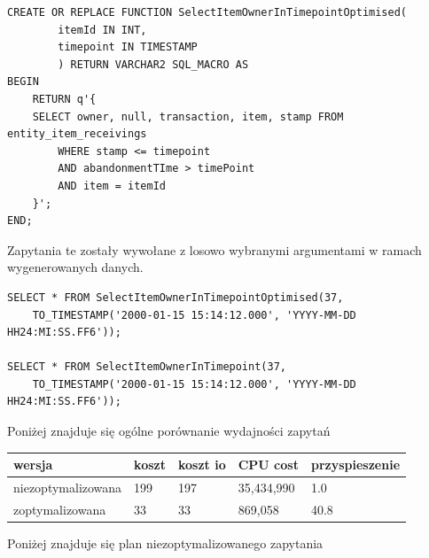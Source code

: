 \documentclass[11pt]{article}
\numberwithin{figure}{subsection}
\begin{document}
		\begin{lstlisting}[caption={Wersja zoptymalizowana},captionpos=b]
CREATE OR REPLACE FUNCTION SelectItemOwnerInTimepointOptimised(
		itemId IN INT,
		timepoint IN TIMESTAMP
		) RETURN VARCHAR2 SQL_MACRO AS
BEGIN
	RETURN q'{
	SELECT owner, null, transaction, item, stamp FROM entity_item_receivings
		WHERE stamp <= timepoint
		AND abandonmentTIme > timePoint
		AND item = itemId
	}';
END;
		\end{lstlisting}
		
		Zapytania te zostały wywołane z losowo wybranymi argumentami w ramach
		wygenerowanych danych. \\
		
		\begin{lstlisting}[caption={Wywołanie zapytań}, captionpos=b]
SELECT * FROM SelectItemOwnerInTimepointOptimised(37,
	TO_TIMESTAMP('2000-01-15 15:14:12.000', 'YYYY-MM-DD HH24:MI:SS.FF6'));

SELECT * FROM SelectItemOwnerInTimepoint(37,
	TO_TIMESTAMP('2000-01-15 15:14:12.000', 'YYYY-MM-DD HH24:MI:SS.FF6'));
		\end{lstlisting}
		
		Poniżej znajduje się ogólne porównanie wydajności zapytań \\
		
		\begin{tabularx}{\textwidth}{|X|X|X|X|X|}
			\hline
			wersja & koszt & koszt io & CPU cost & przyspieszenie \\
			\hline
			niezoptymalizowana & 199 & 197 & 35,434,990 & 1.0 \\
			\hline
			zoptymalizowana & 33 & 33 & 869,058 & 40.8 \\
			\hline
		\end{tabularx}
		
		Poniżej znajduje się plan niezoptymalizowanego zapytania \\
		
\end{document}
